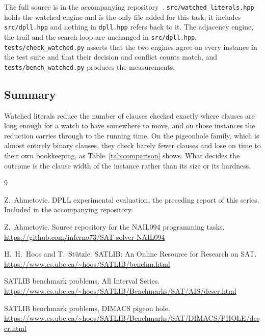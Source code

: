 \documentclass[11pt,a4paper]{article}
\begin{document}
\begin{sloppypar}
The full source is in the accompanying repository~\cite{repo}.
\texttt{src/watched\_literals.hpp} holds the watched engine and is the only file
added for this task; it includes \texttt{src/dpll.hpp} and nothing in
\texttt{dpll.hpp} refers back to it. The adjacency engine, the trail and the
search loop are unchanged in \texttt{src/dpll.hpp}.
\texttt{tests/check\_watched.py} asserts that the two engines agree on every
instance in the test suite and that their decision and conflict counts match,
and \texttt{tests/bench\_watched.py} produces the measurements.
\end{sloppypar}

\subsection*{Summary}

Watched literals reduce the number of clauses checked exactly where clauses are
long enough for a watch to have somewhere to move, and on those instances the
reduction carries through to the running time. On the pigeonhole family, which
is almost entirely binary clauses, they check barely fewer clauses and lose on
time to their own bookkeeping, as Table~\ref{tab:comparison} shows. What decides
the outcome is the clause width of the instance rather than its size or its
hardness.

\begin{thebibliography}{9}

Z.~Ahmetovic.
\newblock DPLL experimental evaluation, the preceding report of this series.
\newblock Included in the accompanying repository.

Z.~Ahmetovic.
\newblock Source repository for the NAIL094 programming tasks.
\newblock \url{https://github.com/inferno73/SAT-solver-NAIL094}

H.~H.~Hoos and T.~St\"utzle.
\newblock SATLIB: An Online Resource for Research on SAT.
\newblock \url{https://www.cs.ubc.ca/~hoos/SATLIB/benchm.html}

SATLIB benchmark problems, All Interval Series.
\newblock \url{https://www.cs.ubc.ca/~hoos/SATLIB/Benchmarks/SAT/AIS/descr.html}

SATLIB benchmark problems, DIMACS pigeon hole.
\newblock \url{https://www.cs.ubc.ca/~hoos/SATLIB/Benchmarks/SAT/DIMACS/PHOLE/descr.html}

\end{thebibliography}
\end{document}
